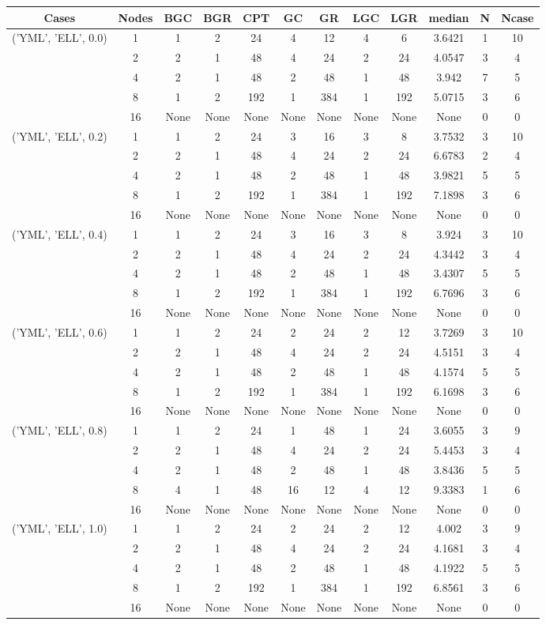 \begin{tabular}{cccccccccccc}
\hline
Cases & Nodes& BGC& BGR& CPT& GC& GR& LGC& LGR& median & N & Ncase \\
\hline
\multirow{5}{*}{('YML', 'ELL', 0.0)}& 1& 1& 2& 24& 4& 12& 4& 6& 3.6421& 1& 10\\
& 2& 2& 1& 48& 4& 24& 2& 24& 4.0547& 3& 4\\
& 4& 2& 1& 48& 2& 48& 1& 48& 3.942& 7& 5\\
& 8& 1& 2& 192& 1& 384& 1& 192& 5.0715& 3& 6\\
& 16& None& None& None& None& None& None& None& None& 0& 0\\
\hline
\multirow{5}{*}{('YML', 'ELL', 0.2)}& 1& 1& 2& 24& 3& 16& 3& 8& 3.7532& 3& 10\\
& 2& 2& 1& 48& 4& 24& 2& 24& 6.6783& 2& 4\\
& 4& 2& 1& 48& 2& 48& 1& 48& 3.9821& 5& 5\\
& 8& 1& 2& 192& 1& 384& 1& 192& 7.1898& 3& 6\\
& 16& None& None& None& None& None& None& None& None& 0& 0\\
\hline
\multirow{5}{*}{('YML', 'ELL', 0.4)}& 1& 1& 2& 24& 3& 16& 3& 8& 3.924& 3& 10\\
& 2& 2& 1& 48& 4& 24& 2& 24& 4.3442& 3& 4\\
& 4& 2& 1& 48& 2& 48& 1& 48& 3.4307& 5& 5\\
& 8& 1& 2& 192& 1& 384& 1& 192& 6.7696& 3& 6\\
& 16& None& None& None& None& None& None& None& None& 0& 0\\
\hline
\multirow{5}{*}{('YML', 'ELL', 0.6)}& 1& 1& 2& 24& 2& 24& 2& 12& 3.7269& 3& 10\\
& 2& 2& 1& 48& 4& 24& 2& 24& 4.5151& 3& 4\\
& 4& 2& 1& 48& 2& 48& 1& 48& 4.1574& 5& 5\\
& 8& 1& 2& 192& 1& 384& 1& 192& 6.1698& 3& 6\\
& 16& None& None& None& None& None& None& None& None& 0& 0\\
\hline
\multirow{5}{*}{('YML', 'ELL', 0.8)}& 1& 1& 2& 24& 1& 48& 1& 24& 3.6055& 3& 9\\
& 2& 2& 1& 48& 4& 24& 2& 24& 5.4453& 3& 4\\
& 4& 2& 1& 48& 2& 48& 1& 48& 3.8436& 5& 5\\
& 8& 4& 1& 48& 16& 12& 4& 12& 9.3383& 1& 6\\
& 16& None& None& None& None& None& None& None& None& 0& 0\\
\hline
\multirow{5}{*}{('YML', 'ELL', 1.0)}& 1& 1& 2& 24& 2& 24& 2& 12& 4.002& 3& 9\\
& 2& 2& 1& 48& 4& 24& 2& 24& 4.1681& 3& 4\\
& 4& 2& 1& 48& 2& 48& 1& 48& 4.1922& 5& 5\\
& 8& 1& 2& 192& 1& 384& 1& 192& 6.8561& 3& 6\\
& 16& None& None& None& None& None& None& None& None& 0& 0\\
\hline
\end{tabular}


